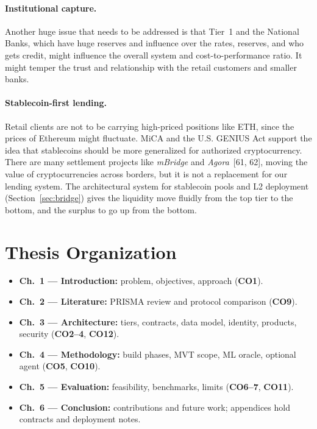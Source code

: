 \documentclass[12pt,a4paper]{report}
\begin{document}
\paragraph{Institutional capture.} Another huge issue that needs to be addressed is that Tier~1 and the National Banks, which have huge reserves and influence over the rates, reserves, and who gets credit, might influence the overall system and cost-to-performance ratio. It might temper the trust and relationship with the retail customers and smaller banks.

\paragraph{Stablecoin-first lending.}
\label{sec:stablecoin-first}
Retail clients are not to be carrying high-priced positions like ETH, since the prices of Ethereum might fluctuate. MiCA and the U.S. GENIUS Act support the idea that stablecoins should be more generalized for authorized cryptocurrency. There are many settlement projects like \textit{mBridge} and \textit{Agora}~[61, 62], moving the value of cryptocurrencies across borders, but it is not a replacement for our lending system. The architectural system for stablecoin pools and L2 deployment (Section~\ref{sec:bridge}) gives the liquidity move fluidly from the top tier to the bottom, and the surplus to go up from the bottom.

\section{Thesis Organization}
\label{sec:thesis-organization}

\begin{itemize}[noitemsep]
\item \textbf{Ch.~1 --- Introduction:} problem, objectives, approach (\textbf{CO1}).
\item \textbf{Ch.~2 --- Literature:} PRISMA review and protocol comparison (\textbf{CO9}).
\item \textbf{Ch.~3 --- Architecture:} tiers, contracts, data model, identity, products, security (\textbf{CO2--4}, \textbf{CO12}).
\item \textbf{Ch.~4 --- Methodology:} build phases, MVT scope, ML oracle, optional agent (\textbf{CO5}, \textbf{CO10}).
\item \textbf{Ch.~5 --- Evaluation:} feasibility, benchmarks, limits (\textbf{CO6--7}, \textbf{CO11}).
\item \textbf{Ch.~6 --- Conclusion:} contributions and future work; appendices hold contracts and deployment notes.
\end{itemize}
\end{document}
